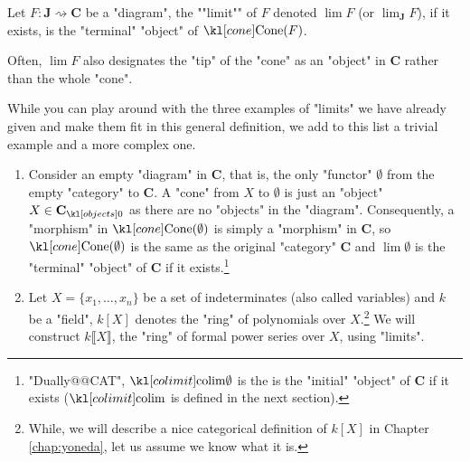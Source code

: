 \documentclass[main.tex]{subfiles}
\begin{document}
\begin{defn}[Limit]
    \AP Let $F:\mathbf{J} \rightsquigarrow \mathbf{C}$ be a "diagram", the ""limit"" of $F$ denoted $\lim F$ (or $\lim_{\mathbf{J}} F$), if it exists, is the "terminal" "object" of $\cone(F)$.
\end{defn}
\begin{rem}
    Often, $\lim F$ also designates the "tip" of the "cone" as an "object" in $\mathbf{C}$ rather than the whole "cone".
\end{rem}
\begin{exmps}
    While you can play around with the three examples of "limits" we have already given and make them fit in this general definition, we add to this list a trivial example and a more complex one.
    \begin{enumerate}
        \item Consider an empty "diagram" in $\mathbf{C}$, that is, the only "functor" $\emptyset$ from the empty "category" to $\mathbf{C}$. A "cone" from $X$ to $\emptyset$ is just an "object" $X \in \obj{\mathbf{C}}$ as there are no "objects" in the "diagram". Consequently, a "morphism" in $\cone(\emptyset)$ is simply a "morphism" in $\mathbf{C}$, so $\cone(\emptyset)$ is the same as the original "category" $\mathbf{C}$ and $\lim \emptyset$ is the "terminal" "object" of $\mathbf{C}$ if it exists.\footnote{"Dually@@CAT", $\colim \emptyset$ is the is the "initial" "object" of $\mathbf{C}$ if it exists ($\colim$ is defined in the next section).}
        \item Let $X = \{x_1, \dots, x_n\}$ be a set of indeterminates (also called variables) and $k$ be a "field", $k[X]$ denotes the "ring" of polynomials over $X$.\footnote{While, we will describe a nice categorical definition of $k[X]$ in Chapter \ref{chap:yoneda}, let us assume we know what it is.} We will construct $k\llbracket X\rrbracket$, the "ring" of formal power series over $X$, using "limits".
        

\end{enumerate}
\end{exmps}
\end{document}
